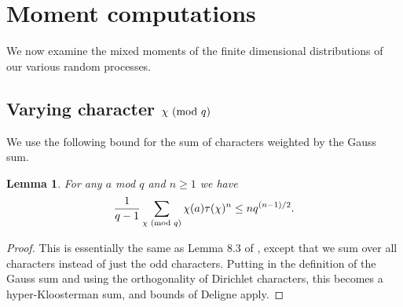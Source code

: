 \documentclass[12pt, a4paper]{amsart}
\newtheorem{lemma}{Lemma}
\theoremstyle{remark}
\renewcommand{\mod}[1]{{\ifmmode\text{\rm\ (mod~$#1$)}\else\discretionary{}{}{\hbox{ }}\rm(mod~$#1$)\fi}}
\begin{document}
\section{Moment computations}\label{sec:moments}
We now examine the mixed moments of the finite dimensional distributions
of our various random processes.
\subsection{Varying character \texorpdfstring{$\chi \mod q$}{}}
We use the following bound for the sum of characters weighted by the Gauss sum.
\begin{lemma}\label{lemma:gauss-sum}
    For any $a$ mod $q$ and $n \ge 1$ we have
    \[
        \frac{1}{q-1}\sum_{\chi \mod q} \chi(a) \tau(\chi)^n \le n q^{(n-1)/2}. 
    \]
\end{lemma}
\begin{proof}
    This is essentially the same as Lemma 8.3 of \cite{GS-large-character-sums},
    except that we sum over all characters instead of just the odd characters.
    Putting in the definition of the Gauss sum and using the orthogonality
    of Dirichlet characters, this becomes a hyper-Kloosterman sum, and bounds
    of Deligne apply.
\end{proof}
\end{document}
